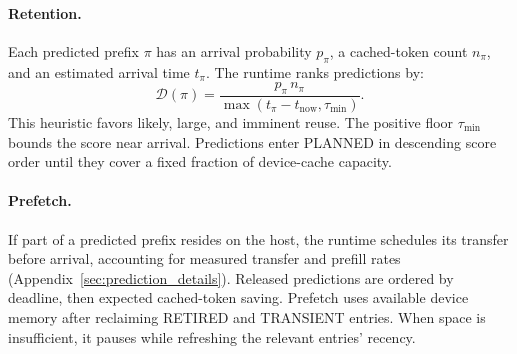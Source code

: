 \paragraph{Retention.}
Each predicted prefix $\pi$ has an arrival probability $p_\pi$, a cached-token count $n_\pi$, and an estimated arrival time $t_\pi$. The runtime ranks predictions by:
\[
\mathcal{D}(\pi)=
\frac{p_\pi\,n_\pi}
{\max(t_\pi-t_{\mathrm{now}},\tau_{\min})}.
\]
This heuristic favors likely, large, and imminent reuse. The positive floor $\tau_{\min}$ bounds the score near arrival. Predictions enter PLANNED in descending score order until they cover a fixed fraction of device-cache capacity. %

\paragraph{Prefetch.}
If part of a predicted prefix resides on the host, the runtime schedules its transfer before arrival, accounting for measured transfer and prefill rates (Appendix~\ref{sec:prediction_details}). Released predictions are ordered by deadline, then expected cached-token saving. Prefetch uses available device memory after reclaiming RETIRED and TRANSIENT entries. When space is insufficient, it pauses while refreshing the relevant entries' recency.